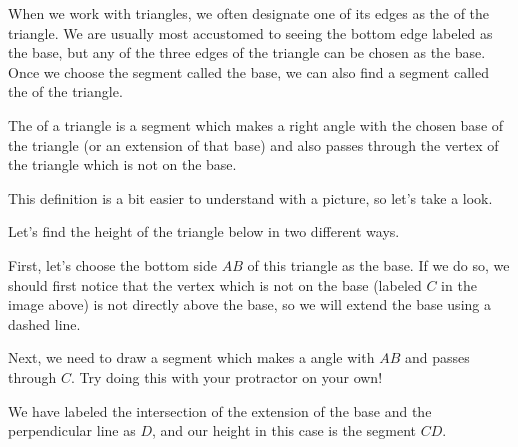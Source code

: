 \documentclass{ximera}
\begin{document}
When we work with triangles, we often designate one of its edges as the  of the triangle. We are usually most accustomed to seeing the bottom edge labeled as the base, but any of the three edges of the triangle can be chosen as the base. Once we choose the segment called the base, we can also find a segment called the  of the triangle.
\begin{definition}
The  of a triangle is a segment which makes a right angle with the chosen base of the triangle (or an extension of that base) and also passes through the vertex of the triangle which is not on the base.
\end{definition}
This definition is a bit easier to understand with a picture, so let's take a look.
\begin{example}
Let's find the height of the triangle below in two different ways.
\begin{image}
\end{image}
First, let's choose the bottom side $AB$ of this triangle as the base. If we do so, we should first notice that the vertex which is not on the base (labeled $C$ in the image above) is not directly above the base, so we will extend the base using a dashed line.
\begin{image}
\end{image}
Next, we need to draw a segment which makes a  angle with $AB$ and passes through $C$. Try doing this with your protractor on your own!
\begin{image}
\end{image}
We have labeled the intersection of the extension of the base and the perpendicular line as $D$, and our height in this case is the segment $CD$.


\end{example}
\end{document}
